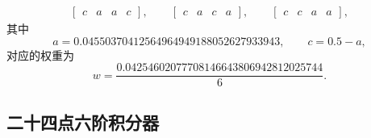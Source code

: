 \begin{itemize}[wide]
\begin{equation}
\begin{gathered}
\begin{bmatrix}c & a & a & c\end{bmatrix},\qquad\begin{bmatrix}c & a & c & a\end{bmatrix},\qquad\begin{bmatrix}c & c & a & a\end{bmatrix},
\end{gathered}
\end{equation}
其中
\begin{equation}
a=0.04550370412564964949188052627933943,\qquad c=0.5-a,
\end{equation}
对应的权重为
\begin{equation}
w=\frac{0.04254602077708146643806942812025744}{6}.
\end{equation}
\end{itemize}
%

\subsection{二十四点六阶积分器}


